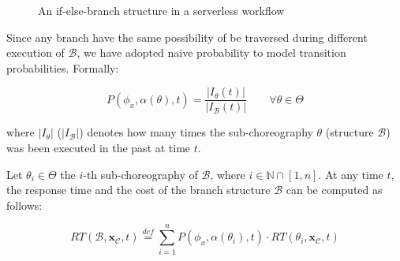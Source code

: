 \documentclass[12pt,a4paper]{report}
\newcommand{\mathDef}{\overset{\textit{def}}{=}}
\newcommand{\N}{\mathbb{N}}
\begin{document}
\begin{figure}
	\caption{An if-else-branch structure in a serverless workflow}
\end{figure}

Since any branch have the same possibility of be traversed during different execution of $\mathcal{B}$, we have adopted naive probability to model transition probabilities. Formally:

\begin{equation}\label{naiveProbability}
	P(\phi_x, \alpha(\theta),t) = \dfrac{|I_{\theta}(t)|}{|I_{\mathcal{B}}(t)|} \qquad \forall \theta \in \Theta
\end{equation}

where $|I_{\theta}|$ ($|I_{\mathcal{B}}|$) denotes how many times the sub-choreography $\theta$ (structure $\mathcal{B}$) was been executed in the past at time $t$.
 
Let $\theta_i \in \Theta$ the $i$-th sub-choreography of $\mathcal{B}$, where $i \in \N \cap \left[1,n\right]$. At any time $t$, the response time and the cost of the branch structure $\mathcal{B}$ can be computed as follows:

\begin{equation}
	RT(\mathcal{B},\textbf{x}_{\mathcal{C}}, t) \mathDef \sum_{i = 1}^n P(\phi_{x}, \alpha(\theta_i),t) \cdot  RT(\theta_i,\textbf{x}_{\mathcal{C}}, t)
\end{equation}
\end{document}
